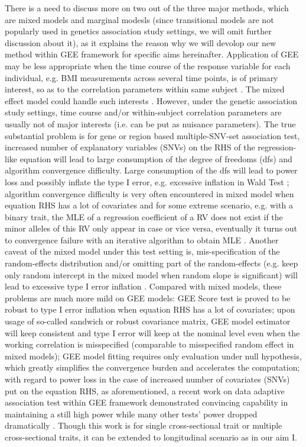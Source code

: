 \documentclass[12pt]{article}
\begin{document}
There is a need to discuss more on two out of the three major methods, which are mixed models and marginal modesls (since transitional models are not popularly used in genetics association study settings, we will omit further discussion about it), as it explains the reason why we will devolop our new method within GEE framework for specific aims hereinafter. Application of GEE may be less appropriate when the time course of the response variable for each individual, e.g. BMI measurements across several time points, is of primary interest, so as to the correlation parameters within same subject \cite{zeger1988models,liang1986longitudinal}. The mixed effect model could handle such interests \cite{laird1982random}. However, under the genetic association study settings, time course and/or within-subject correlation parameters are usually not of major interests (i.e. can be put as nuisance parameters). The true substantial problem is for gene or region based multiple-SNV-set association test, increased number of explanatory variables (SNVs) on the RHS of the regression-like equation will lead to large consumption of the degree of freedoms (dfs) and algorithm convergence difficulty. Large consumption of the dfs will lead to power loss and possibly inflate the type I error, e.g. excessive inflation in Wald Test \cite{guo2005small,pan2001robust,shete2004effect}; algorithm convergence difficulty is very often encountered in mixed model when equation RHS has a lot of covariates and for some extreme scenario, e.g. with a binary trait, the MLE of a regression coefficient of a RV does not exist if the minor alleles of this RV only appear in case or vice versa, eventually it turns out to convergence failure with an iterative algorithm to obtain MLE \cite{zhang2014testing,pan2014powerful}. Another caveat of the mixed model under this test setting is, mis-specification of the random-effects distribution and/or omitting part of the random-effects (e.g. keep only random intercept in the mixed model when random slope is significant) will lead to excessive type I error inflation \cite{litiere2007type,Xu2014}. Compared with mixed models, these problems are much more mild on GEE models: GEE Score test is proved to be robust to type I error inflation when equation RHS has a lot of covariates; upon usage of so-called sandwich or robust covariance matrix, GEE model estimator will keep consistent and type I error will keep at the nominal level even when the working correlation is misspecified (comparable to misspecified random effect in mixed models); GEE model fitting requires only evaluation under null hypothesis, which greatly simplifies the convergence burden and accelerates the computation; with regard to power loss in the case of increased number of covariates (SNVs) put on the equation RHS, as aforementioned, a recent work on data adaptive association test within GEE framework demonstrated convincing capability in maintaining a still high power while many other tests' power dropped dramatically \cite{zhang2014testing,pan2014powerful}. Though this work is for single cross-sectional trait or multiple cross-sectional traits, it can be extended to longitudinal scenario as in our aim I. 
\end{document}
